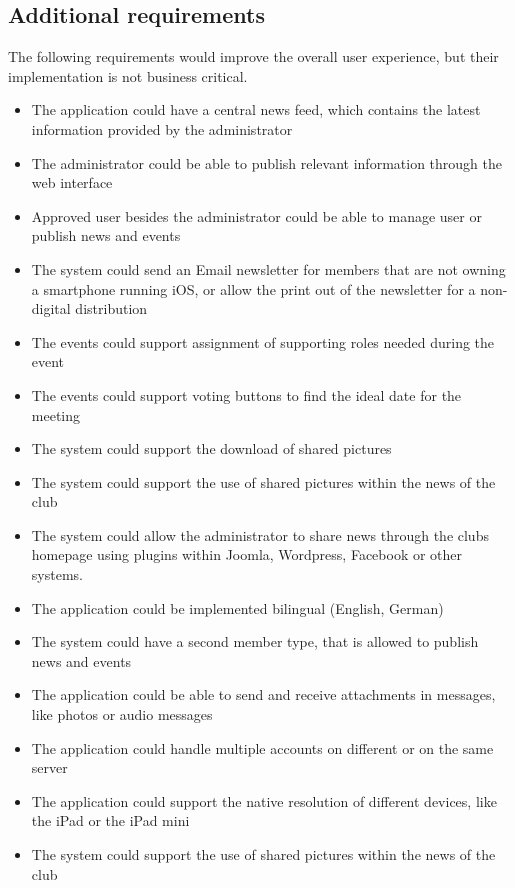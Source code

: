 \subsection{Additional requirements}
The following requirements would improve the overall user experience, but their implementation is not business critical.
\begin{itemize}

\item The application could have a central news feed, which contains the latest information provided by the administrator
\item The administrator could be able to publish relevant information through the web interface
\item Approved user besides the administrator could be able to manage user or publish news and events
\item The system could send an Email newsletter for members that are not owning a smartphone running iOS, or allow the print out of the newsletter for a non-digital distribution
\item The events could support assignment of supporting roles needed during the event
\item The events could support voting buttons to find the ideal date for the meeting
\item The system could support the download of shared pictures
\item The system could support the use of shared pictures within the news of the club
\item The system could allow the administrator to share news through the clubs homepage using plugins within Joomla, Wordpress, Facebook or other systems.
\item The application could be implemented bilingual (English, German)
\item The system could have a second member type, that is allowed to publish news and events
\item The application could be able to send and receive attachments in messages, like photos or audio messages
\item The application could handle multiple accounts on different or on the same server
\item The application could support the native resolution of different devices, like the iPad or the iPad mini
\item The system could support the use of shared pictures within the news of the club
\end{itemize}

